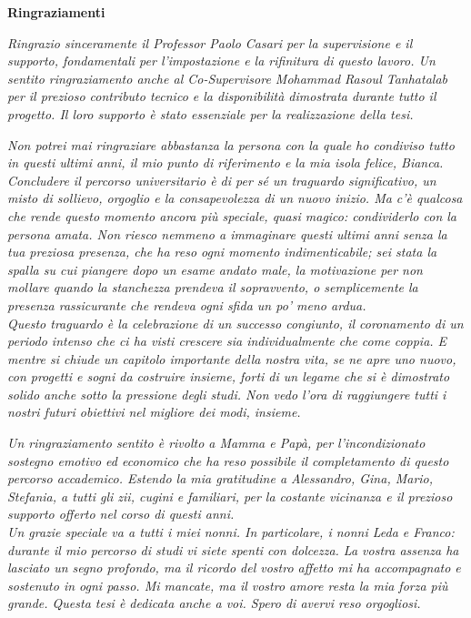 \thispagestyle{empty}

\begin{center}
  {\bf \Huge Ringraziamenti}
\end{center}

\vspace{4cm}

\emph{ Ringrazio sinceramente il Professor Paolo Casari per la supervisione e il
supporto, fondamentali per l'impostazione e la rifinitura di questo lavoro. Un sentito
ringraziamento anche al Co-Supervisore Mohammad Rasoul Tanhatalab per il prezioso
contributo tecnico e la disponibilità dimostrata durante tutto il progetto. Il
loro supporto è stato essenziale per la realizzazione della tesi. }

\;

\emph{ Non potrei mai ringraziare abbastanza la persona con la quale ho condiviso
tutto in questi ultimi anni, il mio punto di riferimento e la mia isola felice, Bianca.
Concludere il percorso universitario è di per sé un traguardo significativo, un misto
di sollievo, orgoglio e la consapevolezza di un nuovo inizio. Ma c'è qualcosa che
rende questo momento ancora più speciale, quasi magico: condividerlo con la persona
amata. Non riesco nemmeno a immaginare questi ultimi anni senza la tua preziosa
presenza, che ha reso ogni momento indimenticabile; sei stata la spalla su cui
piangere dopo un esame andato male, la motivazione per non mollare quando la stanchezza
prendeva il sopravvento, o semplicemente la presenza rassicurante che rendeva
ogni sfida un po' meno ardua.
\noindent
\\ Questo traguardo è la celebrazione di un successo congiunto, il coronamento di
un periodo intenso che ci ha visti crescere sia individualmente che come coppia.
E mentre si chiude un capitolo importante della nostra vita, se ne apre uno nuovo,
con progetti e sogni da costruire insieme, forti di un legame che si è dimostrato
solido anche sotto la pressione degli studi. Non vedo l'ora di raggiungere tutti
i nostri futuri obiettivi nel migliore dei modi, insieme. }

\;

\emph{Un ringraziamento sentito è rivolto a Mamma e Papà, per l'incondizionato sostegno
emotivo ed economico che ha reso possibile il completamento di questo percorso accademico.
Estendo la mia gratitudine a Alessandro, Gina, Mario, Stefania, a tutti gli zii,
cugini e familiari, per la costante vicinanza e il prezioso supporto offerto nel
corso di questi anni.
\noindent
\\ Un grazie speciale va a tutti i miei nonni. In particolare, i nonni Leda e Franco:
durante il mio percorso di studi vi siete spenti con dolcezza. La vostra assenza
ha lasciato un segno profondo, ma il ricordo del vostro affetto mi ha
accompagnato e sostenuto in ogni passo. Mi mancate, ma il vostro amore resta la
mia forza più grande. Questa tesi è dedicata anche a voi. Spero di avervi reso
orgogliosi.}

